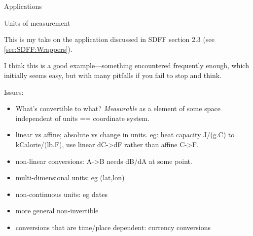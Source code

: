 \documentclass[11pt]{PalisadesLakesBook}
\begin{document}
\begin{plSection}{Applications}
\begin{plSection}{Units of measurement}\label{sec:UOM}

This is my take on the application discussed in SDFF section 2.3
(see \cref{sec:SDFF:Wrappers}).

I think this is a good example---something encountered
frequently enough, which initially seems easy,
but with many pitfalls if you fail to stop and think.

Issues:
\begin{itemize}
  \item What's convertible to what? 
  \emph{Measurable} as a element of some space independent of
  units == coordinate system.
  \item linear vs affine; absolute vs change in units.
  eg: heat capacity J/(g.C) to kCalorie/(lb.F),
  use linear dC->dF rather than affine C->F.
  \item non-linear conversions: A->B needs dB/dA at some point.
  \item multi-dimensional units: eg (lat,lon)
  \item non-continuous units: eg dates
  \item more general non-invertible
  \item conversions that are time/place dependent: 
  currency conversions
\end{itemize}
 
\end{plSection}%
\end{plSection}%
\BeginAppendices

\end{document}
